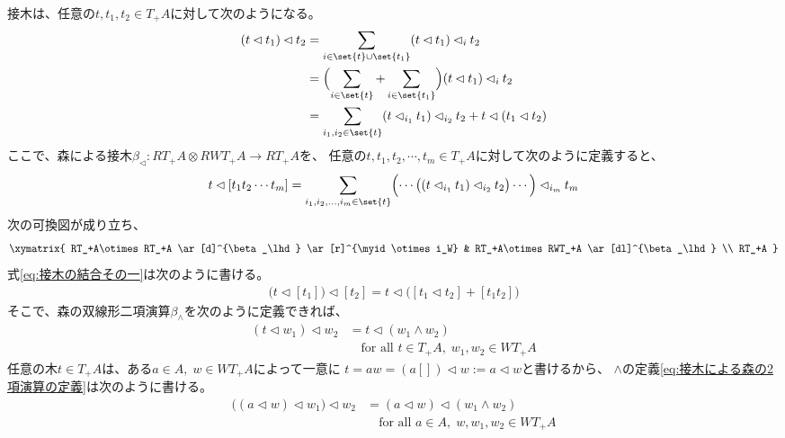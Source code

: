 		接木は、任意の$t,t_1,t_2\in T_+A$に対して次のようになる。
		\begin{equation}\label{eq:接木の結合その一}\begin{split} %
			(t\lhd t_1)\lhd t_2 
			&= \sum_{i\in\set{t}\cup\set{t_1}}(t\lhd t_1)\lhd_i t_2 \\
			&= \Bigl(\sum_{i\in\set{t}}+\sum_{i\in\set{t_1}}\Bigr)(t\lhd t_1)\lhd_i t_2 \\
			&= \sum_{i_1,i_2\in\set{t}}(t\lhd_{i_1} t_1)\lhd_{i_2}t_2
			+ t\lhd (t_1\lhd t_2) \\
		\end{split}\end{equation} %
		ここで、森による接木$\beta_\lhd:RT_+A\otimes RWT_+A\to RT_+A$を、
		任意の$t,t_1,t_2,\cdots,t_m\in T_+A$に対して次のように定義すると、
		\begin{equation*}\begin{split} %
			t\lhd [t_1t_2\cdots t_m] 
			&= \sum_{i_1,i_2,\dots,i_m\in\set{t}}
			\Bigl(\cdots\bigl((t\lhd_{i_1}t_1)\lhd_{i_2}t_2\bigr)\cdots\Bigr)\lhd_{i_m}t_m \\
		\end{split}\end{equation*} %
		次の可換図が成り立ち、
		\begin{equation*}\xymatrix{
			RT_+A\otimes RT_+A \ar[d]^{\beta_\lhd} \ar[r]^{\myid\otimes i_W}
			& RT_+A\otimes RWT_+A \ar[dl]^{\beta_\lhd} \\
			RT_+A
		}\end{equation*}
		式\eqref{eq:接木の結合その一}は次のように書ける。
		\begin{equation*}\begin{split} %
			\bigl(t\lhd[t_1]\bigr)\lhd[t_2]
			= t\lhd\bigl([t_1\lhd t_2] + [t_1t_2]\bigr)
		\end{split}\end{equation*} %
		そこで、森の双線形二項演算$\beta_\land$を次のように定義できれば、
		\begin{equation}\label{eq:接木による森の2項演算の定義}\begin{split} %
			(t\lhd w_1)\lhd w_2 &= t\lhd (w_1\land w_2) \\
			&\quad\text{for all }t\in T_+A,\;w_1,w_2\in WT_+A
		\end{split}\end{equation} %
		任意の木$t\in T_+A$は、ある$a\in A,\;w\in WT_+A$によって一意に
		$t=aw=(a[])\lhd w:=a\lhd w$と書けるから、
		$\land$の定義\eqref{eq:接木による森の2項演算の定義}は次のように書ける。
		\begin{equation*}\begin{split} %
			\bigl((a\lhd w)\lhd w_1\bigr)\lhd w_2 &= (a\lhd w)\lhd(w_1\land w_2) \\
			&\quad\text{for all }a\in A,\;w,w_1,w_2\in WT_+A
		\end{split}\end{equation*} %

